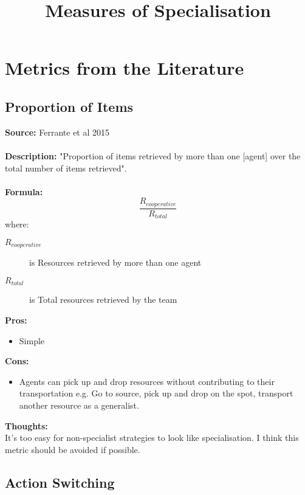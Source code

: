\documentclass[12pt]{article}
\title{Measures of Specialisation}
\begin{document}
\maketitle

\section{Metrics from the Literature}

\subsection{Proportion of Items}
\textbf{Source: }Ferrante et al 2015 \cite{ferrante:PLoSCB:2015} \\\\
\textbf{Description: } "Proportion of items retrieved by more than one [agent] over the total number of items retrieved".\\\\
\textbf{Formula: }\\
%
\[
\frac{R_{cooperative}}{R_{total}}
\]
where:
\begin{description}
\item[$R_{cooperative}$] is Resources retrieved by more than one agent
\item[$R_{total}$] is Total resources retrieved by the team
\end{description}
%
\textbf{Pros:}
\begin{itemize}
\item Simple
\end{itemize}
\textbf{Cons:}
\begin{itemize}
\item Agents can pick up and drop resources without contributing to their transportation e.g. Go to source, pick up and drop on the spot, transport another resource as a generalist.
\end{itemize}
\textbf{Thoughts:}\\
It's too easy for non-specialist strategies to look like specialisation.
I think this metric should be avoided if possible.

\subsection{Action Switching}
\end{document}
